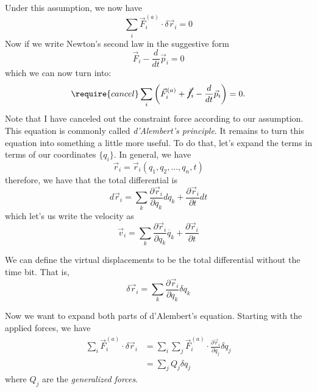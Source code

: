 \documentclass{article}
\begin{document}
Under this assumption, we now have
\begin{equation}
  \sum_i \vec{F}_i^{(a)}\cdot \delta \vec{r}_i = 0 
\end{equation}
Now if we write Newton's second law in the suggestive form
\begin{equation}
  \vec{F}_i - \frac{d}{dt}\vec{p}_i = 0 
\end{equation}
which we can now turn into:
\begin{equation}
  \require{cancel}
  \sum_i \left( \vec{F}_i^{(a)}+\cancel{\vec{f}_i}-\frac{d}{dt}\vec{p}_i \right) = 0 .
\end{equation}
Note that I have canceled out the constraint force according to our assumption.
This equation is commonly called \textit{d'Alembert's principle}. 
It remains to turn this equation into something a little more useful. To do
that, let's expand the terms in terms of our coordinates $\{q_i\}$. In general,
we have
\begin{equation}
  \vec{r}_i = \vec{r}_i\left( q_1, q_2, ... , q_n , t \right)
\end{equation}
therefore, we have that the total differential is
\begin{equation}
  d\vec{r}_i = \sum_k \frac{\partial \vec{r}_i}{\partial q_k}dq_k + \frac{\partial \vec{r}_i}{\partial t}dt
\end{equation}
which let's us write the velocity as
\begin{equation}
  \vec{v}_i = \sum_k \frac{\partial \vec{r}_i}{\partial q_k}\dot{q_k} + \frac{\partial \vec{r}_i}{\partial t}
\end{equation}

We can define the virtual displacements to be the total differential without the
time bit. That is,
\begin{equation}
  \delta\vec{r}_i = \sum_k \frac{\partial \vec{r}_i}{\partial q_k} \delta q_k 
\end{equation}

Now we want to expand both parts of d'Alembert's equation. Starting with
the applied forces, we have
\begin{align}
  \sum_i \vec{F}_i^{(a)}\cdot \delta \vec{r}_i &= \sum_i\sum_j\vec{F}_i^{(a)}\cdot
                                                 \frac{\partial \vec{r}_i}{\partial q_j}\delta q_j \\
                                               &= \sum_j Q_j\delta q_j
\end{align}
where $Q_j$ are the \textit{generalized forces}. 
\end{document}
